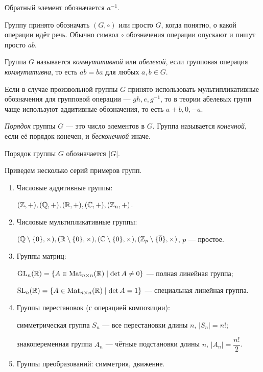 Обратный элемент обозначается $a^{-1}$.

Группу принято обозначать $(G, \circ)$ или просто $G$, когда понятно, о какой операции идёт речь. Обычно символ $\circ$ обозначения операции опускают и пишут просто $ab$.

\begin{definition}
    Группа $G$ называется \textit{коммутативной} или \textit{абелевой}, если групповая операция \textit{коммутативна}, то есть $ab = ba$ для любых $a, b \in G$.
\end{definition}

Если в случае произвольной группы $G$ принято использовать мультипликативные обозначения для групповой операции --- $gh, e, g^{-1}$, то в теории абелевых групп чаще используют аддитивные обозначения, то есть $a + b, 0, -a$.

\begin{definition}
    \textit{Порядок} группы $G$ --- это число элементов в $G$. Группа называется \textit{конечной}, если её порядок конечен, и \textit{бесконечной} иначе.
\end{definition}

Порядок группы $G$ обозначается $|G|$.

\bigskip
Приведем несколько серий примеров групп.
\begin{enumerate}
\item Числовые аддитивные группы:

    $(\mathbb{Z}, +), (\mathbb{Q}, +), (\mathbb{R}, +), (\mathbb{C}, +), (\mathbb{Z}_n, +)$.

\item Числовые мультипликативные группы:
    
    $(\mathbb{Q} \setminus \{0\}, \times), (\mathbb{R} \setminus \{0\}, \times), (\mathbb{C} \setminus \{0\}, \times), (\mathbb{Z}_p \setminus \{\overline{0}\}, \times)$, $p$ --- простое.

\item Группы матриц:
    
    $\mathrm{GL}_n(\mathbb{R}) = \{A \in \mathrm{Mat}_{n \times n}(\mathbb{R}) \mid \det A \neq 0\}$ --- полная линейная группа;

    $\mathrm{SL}_n(\mathbb{R}) = \{A \in \mathrm{Mat}_{n \times n}(\mathbb{R}) \mid \det A = 1\}$ --- специальная линейная группа.

\item Группы перестановок (с операцией композиции):

    симметрическая группа $S_n$ --- все перестановки длины $n$, $|S_n| = n!$;

    знакопеременная группа $A_n$ --- чётные подстановки длины $n$, $|A_n| = \dfrac{n!}{2}$.

\item Группы преобразований: симметрия, движение.
\end{enumerate}



